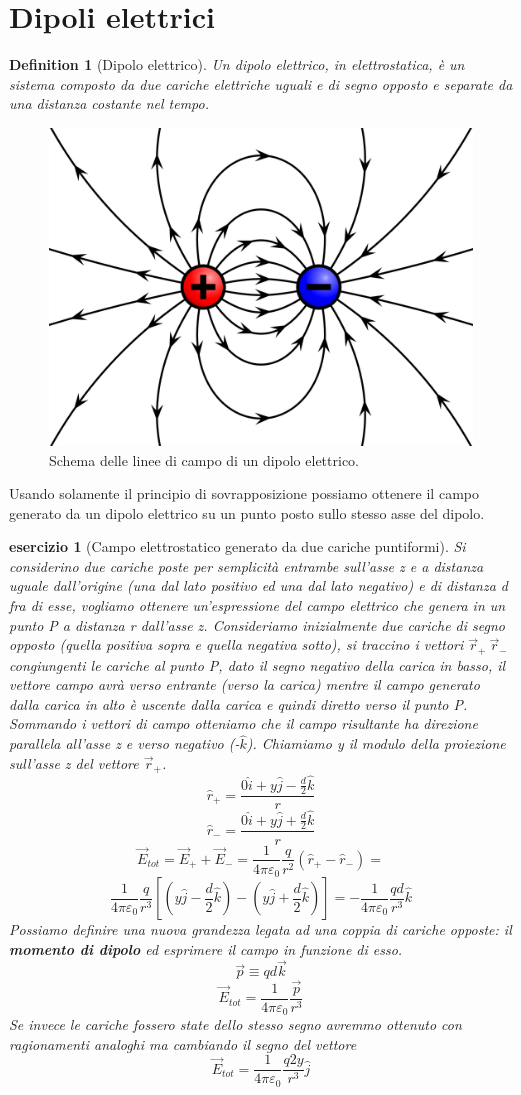 \documentclass[10pt,a4paper]{article}
\newtheorem{esercizio}{esercizio}
\newtheorem{definition}{Definition}
\begin{document}
\section{Dipoli elettrici}
\begin{definition}[Dipolo elettrico]
	Un dipolo elettrico, in elettrostatica, è un sistema composto da due cariche elettriche uguali e di segno opposto e separate da una distanza costante nel tempo.
\end{definition}
\begin{figure}[h!]
	\centering
	\includegraphics[width=0.4\linewidth]{images/dipolo_elettrico}
	\caption{Schema delle linee di campo di un dipolo elettrico.}
	\label{fig:dipoloelettrico}
\end{figure}
\FloatBarrier
Usando solamente il principio di sovrapposizione possiamo ottenere il campo generato da un dipolo elettrico su un punto posto sullo stesso asse del dipolo.
\begin{esercizio}[Campo elettrostatico generato da due cariche puntiformi]
	Si considerino due cariche poste per semplicità entrambe sull'asse z e a distanza uguale dall'origine (una dal lato positivo ed una dal lato negativo) e di distanza d fra di esse, vogliamo ottenere un'espressione del campo elettrico che genera in un punto P a distanza r dall'asse z. Consideriamo inizialmente due cariche di segno opposto (quella positiva sopra e quella negativa sotto), si traccino i vettori \(\vec{r}_+ \ \vec{r}_- \) congiungenti le cariche al punto P, dato il segno negativo della carica in basso, il vettore campo avrà verso entrante (verso la carica) mentre il campo generato dalla carica in alto è uscente dalla carica e quindi diretto verso il punto P. Sommando i vettori di campo otteniamo che il campo risultante ha direzione parallela all'asse z e verso negativo (-$\hat{k}$). Chiamiamo y il modulo della proiezione sull'asse z del vettore $\vec{r}_+$.
	\[\hat{r}_+ =\frac{ 0\hat{i}+y \hat{j}-\frac{d}{2}\hat{k}}{r}\]
	\[\hat{r}_- = \frac{0\hat{i}+y \hat{j}+\frac{d}{2}\hat{k}}{r}\]
	\[\vec{E}_{tot} = \vec{E}_{+} + \vec{E}_{-} = \frac{1}{4\pi\varepsilon_0}\frac{q}{r^2}\left(\hat{r}_+-\hat{r}_-\right)=\]
	\[\frac{1}{4\pi\varepsilon_0}\frac{q}{r^3}\left[(y\hat{j}-\frac{d}{2}\hat{k})-(y\hat{j}+\frac{d}{2}\hat{k})\right]= -\frac{1}{4\pi\varepsilon_0}\frac{q d}{r^3}\hat{k}\]
	Possiamo definire una nuova grandezza legata ad una coppia di cariche opposte: il \textbf{momento di dipolo} ed esprimere il campo in funzione di esso.
	\[\vec{p} \equiv qd\vec{k}\]
	\[\vec{E}_{tot} = \frac{1}{4\pi\varepsilon_0}\frac{\vec{p}}{r^3}\]
	Se invece le cariche fossero state dello stesso segno avremmo ottenuto con ragionamenti analoghi ma cambiando il segno del vettore
	\[\vec{E}_{tot} = \frac{1}{4\pi\varepsilon_0}\frac{q2y}{r^3}\hat{j}\]
\end{esercizio}
\end{document}
